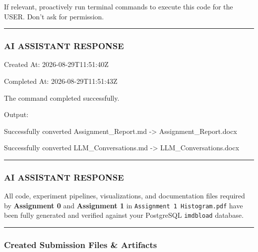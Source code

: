 \documentclass[11pt,a4paper]{article}
\begin{document}
{If relevant, proactively run terminal commands to execute this code for the USER. Don't ask for permission.


\hrule

\subsubsection{AI ASSISTANT RESPONSE}

Created At: 2026-08-29T11:51:40Z

Completed At: 2026-08-29T11:51:43Z


The command completed successfully.

Output:

Successfully converted Assignment\_Report.md -> Assignment\_Report.docx

Successfully converted LLM\_Conversations.md -> LLM\_Conversations.docx


\hrule

\subsubsection{AI ASSISTANT RESPONSE}

All code, experiment pipelines, visualizations, and documentation files required by \textbf{Assignment 0} and \textbf{Assignment 1} in \texttt{Assignment 1 Histogram.pdf} have been fully generated and verified against your PostgreSQL \texttt{imdbload} database.


\hrule


\subsubsection{Created Submission Files \& Artifacts}

}
\end{document}
